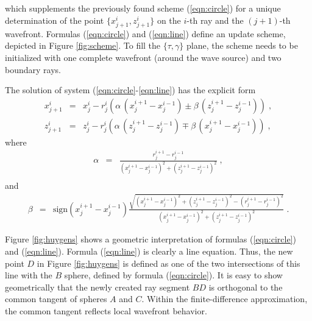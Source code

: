 which supplements the previously found scheme (\ref{eqn:circle}) for a
unique determination of the point $\{x_{j+1}^i,z_{j+1}^i\}$ on the
$i$-th ray and the $(j+1)$-th wavefront. Formulas (\ref{eqn:circle})
and (\ref{eqn:line}) define an update scheme, depicted in Figure
\ref{fig:scheme}. To fill the $\{\tau,\gamma\}$ plane, the scheme
needs to be initialized with one complete wavefront (around the wave
source) and two boundary rays.
\par
The solution of system (\ref{eqn:circle}-\ref{eqn:line}) has the
explicit form
\begin{eqnarray}
  \label{eqn:xsol}
  x_{j+1}^i & = & x_j^i - r_j^i \left(
    \alpha\,\left(x_j^{i+1} - x_j^{i-1}\right) \pm
    \beta\,\left(z_j^{i+1} - z_j^{i-1}\right)\right)\;, \\
   \label{eqn:zsol}
  z_{j+1}^i & = & z_j^i - r_j^i \left(
    \alpha\,\left(z_j^{i+1} - z_j^{i-1}\right) \mp
    \beta\,\left(x_j^{i+1} - x_j^{i-1}\right)\right)\;, 
\end{eqnarray}
where 
\begin{eqnarray}
  \label{eqn:alfa}
  \alpha & = & \frac{r_j^{i+1} - r_j^{i-1}}
  {\left(x_j^{i+1} - x_j^{i-1}\right)^2 + \left(z_j^{i+1} - z_j^{i-1}\right)^2} \;, \\ 
\end{eqnarray}
and 
\begin{eqnarray}
  \label{eqn:beta}
  \beta & = & 
  \mbox{sign}\left( x_j^{i+1} - x_j^{i-1} \right)
  \frac{\sqrt{
      \left(x_j^{i+1} - x_j^{i-1}\right)^2 + 
      \left(z_j^{i+1} - z_j^{i-1}\right)^2 -
      \left(r_j^{i+1} - r_j^{i-1}\right)^2
  }}
  {
  \left(x_j^{i+1} - x_j^{i-1}\right)^2 + 
  \left(z_j^{i+1} - z_j^{i-1}\right)^2 
  }
  \;.
\end{eqnarray}

\par
{}
Figure \ref{fig:huygens} shows a geometric interpretation of formulas
(\ref{eqn:circle}) and (\ref{eqn:line}). Formula (\ref{eqn:line}) is
clearly a line equation. Thus, the new point $D$ in Figure
\ref{fig:huygens} is defined as one of the two intersections of this
line with the $B$ sphere, defined by formula (\ref{eqn:circle}). It is
easy to show geometrically that the newly created ray segment $BD$ is
orthogonal to the common tangent of spheres $A$ and $C$. Within the
finite-difference approximation, the common tangent reflects local
wavefront behavior.

